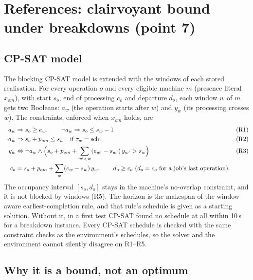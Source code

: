 \documentclass[11pt,a4paper]{article}
\newcommand{\sch}{\mathrm{sch}}
\begin{document}
\section{References: clairvoyant bound under breakdowns (point 7)}
\label{sec:reference}

\subsection{CP-SAT model}

The blocking CP-SAT model is extended with the windows of each stored realisation. For every
operation $o$ and every eligible machine $m$ (presence literal $x_{om}$), with start $s_o$,
end of processing $c_o$ and departure $d_o$, each window $w$ of $m$ gets two Booleans: $a_w$
(the operation starts after $w$) and $y_w$ (its processing crosses $w$). The constraints,
enforced when $x_{om}$ holds, are
\begin{align*}
  a_w &\Rightarrow s_o\ge e_w, \qquad \neg a_w \Rightarrow s_o\le s_w-1 && \text{(R1)}\\
  \neg a_w &\Rightarrow s_o+p_{om}\le s_w \quad\text{if } \tau_w=\sch && \text{(R2)}\\
  y_w &\Leftrightarrow \neg a_w \wedge \Bigl(s_o+p_{om}+\sum_{w'<w}(e_{w'}-s_{w'})\,y_{w'}>s_w\Bigr) && \text{(R3)}\\
  c_o &= s_o+p_{om}+\sum_w (e_w-s_w)\,y_w, \qquad d_o\ge c_o \ (d_o=c_o \text{ for a job's last operation}).
\end{align*}
The occupancy interval $[s_o,d_o]$ stays in the machine's no-overlap constraint, and it is not
blocked by windows (R5). The horizon is the makespan of the window-aware earliest-completion
rule, and that rule's schedule is given as a starting solution. Without it, in a first test
CP-SAT found no schedule at all within 10\,s for a breakdown instance. Every CP-SAT schedule is checked with
the same constraint checks as the environment's schedules, so the solver and the environment
cannot silently disagree on R1--R5.

\subsection{Why it is a bound, not an optimum}
\end{document}
